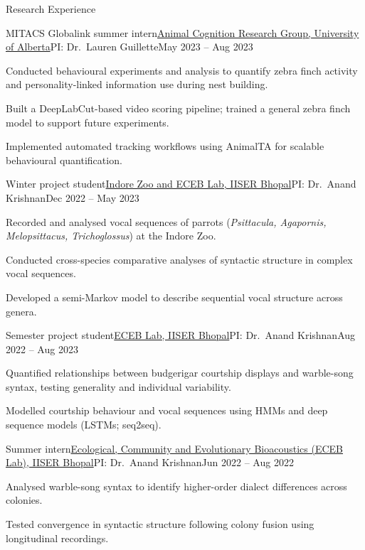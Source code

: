 \documentclass{resume}
\begin{document}
\begin{rSection}{Research Experience}
\begin{rSubsection}{MITACS Globalink summer intern}{\href{https://sites.psych.ualberta.ca/animal-cognition-ualberta/}{Animal Cognition Research Group, University of Alberta}}{PI: Dr.\ Lauren Guillette}{May 2023 -- Aug 2023}
\item Conducted behavioural experiments and analysis to quantify zebra finch activity and personality-linked information use during nest building.
\item Built a DeepLabCut-based video scoring pipeline; trained a general zebra finch model to support future experiments.
\item Implemented automated tracking workflows using AnimalTA for scalable behavioural quantification.
\end{rSubsection}

\begin{rSubsection}{Winter project student}{\href{https://knpsi.in/about.php}{Indore Zoo and ECEB Lab, IISER Bhopal}}{PI: Dr.\ Anand Krishnan}{Dec 2022 -- May 2023}
\item Recorded and analysed vocal sequences of parrots (\textit{Psittacula, Agapornis, Melopsittacus, Trichoglossus}) at the Indore Zoo.
\item Conducted cross-species comparative analyses of syntactic structure in complex vocal sequences.
\item Developed a semi-Markov model to describe sequential vocal structure across genera.
\end{rSubsection}

\begin{rSubsection}{Semester project student}{\href{https://sites.google.com/view/eceb-lab}{ECEB Lab, IISER Bhopal}}{PI: Dr.\ Anand Krishnan}{Aug 2022 -- Aug 2023}
\item Quantified relationships between budgerigar courtship displays and warble-song syntax, testing generality and individual variability.
\item Modelled courtship behaviour and vocal sequences using HMMs and deep sequence models (LSTMs; seq2seq).
\end{rSubsection}

\begin{rSubsection}{Summer intern}{\href{https://sites.google.com/view/eceb-lab}{Ecological, Community and Evolutionary Bioacoustics (ECEB Lab), IISER Bhopal}}{PI: Dr.\ Anand Krishnan}{Jun 2022 -- Aug 2022}
\item Analysed warble-song syntax to identify higher-order dialect differences across colonies.
\item Tested convergence in syntactic structure following colony fusion using longitudinal recordings.
\end{rSubsection}


\end{rSection}
\end{document}
